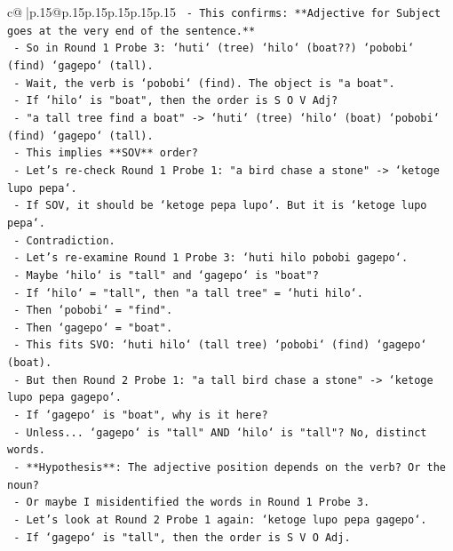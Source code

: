 \documentclass{article}
\begin{document}
{\begin{supertabular}{c@{$\;$}|p{.15\linewidth}@{}p{.15\linewidth}p{.15\linewidth}p{.15\linewidth}p{.15\linewidth}p{.15\linewidth}}
{{{\texttt{      {-} This confirms: **Adjective for Subject goes at the very end of the sentence.**} \\
\texttt{      {-} So in Round 1 Probe 3: `huti` (tree) `hilo` (boat??) `pobobi` (find) `gagepo` (tall).} \\
\texttt{      {-} Wait, the verb is `pobobi` (find). The object is "a boat".} \\
\texttt{      {-} If `hilo` is "boat", then the order is S O V Adj?} \\
\texttt{      {-} "a tall tree find a boat" {-}> `huti` (tree) `hilo` (boat) `pobobi` (find) `gagepo` (tall).} \\
\texttt{      {-} This implies **SOV** order?} \\
\texttt{      {-} Let's re{-}check Round 1 Probe 1: "a bird chase a stone" {-}> `ketoge lupo pepa`.} \\
\texttt{      {-} If SOV, it should be `ketoge pepa lupo`. But it is `ketoge lupo pepa`.} \\
\texttt{      {-} Contradiction.} \\
\texttt{      {-} Let's re{-}examine Round 1 Probe 3: `huti hilo pobobi gagepo`.} \\
\texttt{      {-} Maybe `hilo` is "tall" and `gagepo` is "boat"?} \\
\texttt{      {-} If `hilo` = "tall", then "a tall tree" = `huti hilo`.} \\
\texttt{      {-} Then `pobobi` = "find".} \\
\texttt{      {-} Then `gagepo` = "boat".} \\
\texttt{      {-} This fits SVO: `huti hilo` (tall tree) `pobobi` (find) `gagepo` (boat).} \\
\texttt{      {-} But then Round 2 Probe 1: "a tall bird chase a stone" {-}> `ketoge lupo pepa gagepo`.} \\
\texttt{      {-} If `gagepo` is "boat", why is it here?} \\
\texttt{      {-} Unless... `gagepo` is "tall" AND `hilo` is "tall"? No, distinct words.} \\
\texttt{      {-} **Hypothesis**: The adjective position depends on the verb? Or the noun?} \\
\texttt{      {-} Or maybe I misidentified the words in Round 1 Probe 3.} \\
\texttt{      {-} Let's look at Round 2 Probe 1 again: `ketoge lupo pepa gagepo`.} \\
\texttt{      {-} If `gagepo` is "tall", then the order is S V O Adj.} \\
}}}
\end{supertabular}}
\end{document}
